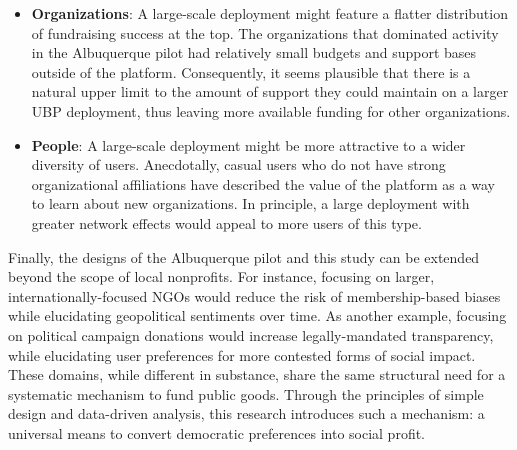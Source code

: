 \begin{itemize}

  \item \textbf{Organizations}: A large-scale deployment might feature a flatter distribution of fundraising success at the top.
    The organizations that dominated activity in the Albuquerque pilot had relatively small budgets and support bases outside of the platform.
    Consequently, it seems plausible that there is a natural upper limit to the amount of support they could maintain on a larger UBP deployment, thus leaving more available funding for other organizations.

  \item \textbf{People}: A large-scale deployment might be more attractive to a wider diversity of users.
Anecdotally, casual users who do not have strong organizational affiliations have described the value of the platform as a way to learn about new organizations.
In principle, a large deployment with greater network effects would appeal to more users of this type.

\end{itemize}

Finally, the designs of the Albuquerque pilot and this study can be extended beyond the scope of local nonprofits.
For instance, focusing on larger, internationally-focused NGOs would reduce the risk of membership-based biases while elucidating geopolitical sentiments over time.
As another example, focusing on political campaign donations would increase legally-mandated transparency, while elucidating user preferences for more contested forms of social impact.  
These domains, while different in substance, share the same structural need for a systematic mechanism to fund public goods.
Through the principles of simple design and data-driven analysis, this research introduces such a mechanism: a universal means to convert democratic preferences into social profit.
